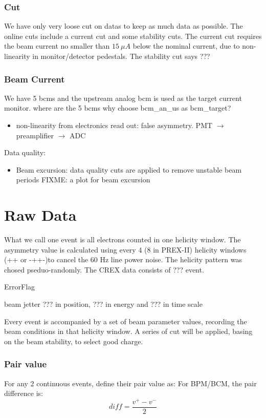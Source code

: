 \subsubsection{Cut}
We have only very loose cut on datas to keep as much data as possible. The online
cuts include a current cut and some stability cuts. The current cut requires
the beam current no smaller than $15\ \mu A$ below the nominal current, due to 
non-linearity in monitor/detector pedestals. The stability cut says ???
\subsubsection{Beam Current}
We have 5 bcms and the upstream analog bcm is used as the target current monitor.
where are the 5 bcms
why choose bcm\_an\_us as bcm\_target?

\begin{itemize}
    \item non-linearity from electronics read out: false asymmetry. PMT $\rightarrow$
	preamplifier $\rightarrow$ ADC
\end{itemize}

Data quality:
\begin{itemize}
    \item Beam excursion: data quality cuts are applied to remove unstable beam periods
	FIXME: a plot for beam excursion
\end{itemize}

\section{Raw Data}
What we call one event is all electrons counted in one helicity window.
The asymmetry value is calculated using every 4 (8 in PREX-II) helicity windows
(+\-\-+ or -++-)to cancel the 60 Hz line power noise. The helicity pattern was
chosed pseduo-randomly. The CREX data consists of ??? event.

ErrorFlag 

beam jetter ??? in position, ??? in energy and ??? in time scale

Every event
is accompanied by a set of beam parameter values, recording the beam conditions
in that helicity window. A series of cut will be applied, basing on the beam
stability, to select good charge.

\subsubsection{Pair value}
For any 2 continuous events, define their pair value as:
For BPM/BCM, the pair difference is:
$$ diff = \frac{v^+ - v^-}{2} $$

